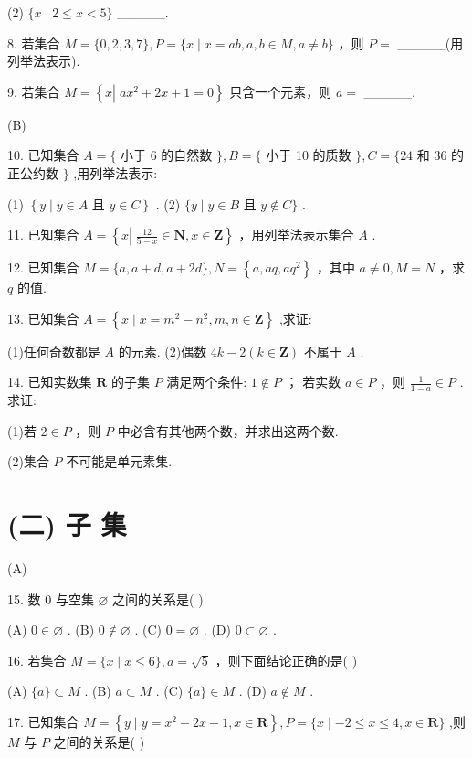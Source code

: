 \documentclass[10pt]{article}
\newcommand*\circled[1]{\tikz[baseline=(char.base)]{\node[shape=circle,draw,inner sep=1.5pt] (char) {\small #1};}}
\begin{document}
(2) \(\{ x \mid  2 \leq  x < 5\}\) \_\_\_\_\_.

8. 若集合 \(M = \{ 0,2,3,7\} ,P = \{ x \mid  x = {ab},a,b \in  M,a \neq  b\}\) ，则 \(P =\) \_\_\_\_\_(用列举法表示).

9. 若集合 \(M = \left\{  {x\left| {\;a{x}^{2} + {2x} + 1 = 0}\right. }\right\}\) 只含一个元素，则 \(a =\) \_\_\_\_\_.

(B)

10. 已知集合 \(A = \{\) 小于 6 的自然数 \(\} ,B = \{\) 小于 10 的质数 \(\} ,C = \{ {24}\) 和 36 的正公约数 \(\}\) ,用列举法表示:

(1) \(\left\{  {y \mid  y \in  A\text{ 且 }y \in  C}\right\}\) . (2) \(\{ y \mid  y \in  B\) 且 \(y \notin  C\}\) .

11. 已知集合 \(A = \left\{  {x\left| {\;\frac{12}{5 - x} \in  \mathbf{N}}\right. ,x \in  \mathbf{Z}}\right\}\) ，用列举法表示集合 \(A\) .

12. 已知集合 \(M = \{ a,a + d,a + {2d}\} ,N = \left\{  {a,{aq},a{q}^{2}}\right\}\) ，其中 \(a \neq  0,M = N\) ，求 \(q\) 的值.

13. 已知集合 \(A = \left\{  {x \mid  x = {m}^{2} - {n}^{2},m,n \in  \mathbf{Z}}\right\}\) ,求证:

(1)任何奇数都是 \(A\) 的元素. (2)偶数 \({4k} - 2\left( {k \in  \mathbf{Z}}\right)\) 不属于 \(A\) .

14. 已知实数集 \(\mathbf{R}\) 的子集 \(P\) 满足两个条件: \circled{1}  \(1 \notin  P\) ； \circled{2} 若实数 \(a \in  P\) ，则 \(\frac{1}{1 - a} \in  P\) . 求证:

(1)若 \(2 \in  P\) ，则 \(P\) 中必含有其他两个数，并求出这两个数.

(2)集合 \(P\) 不可能是单元素集.

\section*{(二) 子 集}

(A)

15. 数 0 与空集 \(\varnothing\) 之间的关系是( )

(A) \(0 \in  \varnothing\) . (B) \(0 \notin  \varnothing\) . (C) \(0 = \varnothing\) . (D) \(0 \subset  \varnothing\) .

16. 若集合 \(M = \{ x \mid  x \leq  6\} ,a = \sqrt{5}\) ，则下面结论正确的是( )

(A) \(\{ a\}  \subset  M\) . (B) \(a \subset  M\) . (C) \(\{ a\}  \in  M\) . (D) \(a \notin  M\) .

17. 已知集合 \(M = \left\{  {y \mid  y = {x}^{2} - {2x} - 1,x \in  \mathbf{R}}\right\}  ,P = \{ x \mid   - 2 \leq  x \leq  4,x \in  \mathbf{R}\}\) ,则 \(M\) 与 \(P\) 之间的关系是( )
\end{document}
